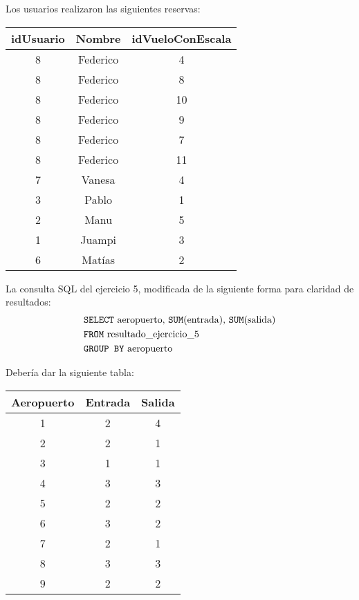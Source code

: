\documentclass{article}
\begin{document}
Los usuarios realizaron las siguientes reservas:
\begin{center}
	\begin{tabular}{ c | c | c }
	\textbf{idUsuario} & \textbf{Nombre} & \textbf{idVueloConEscala} \\ \hline
		8 & Federico & 4 \\
		8 & Federico & 8 \\
		8 & Federico & 10 \\
		8 & Federico & 9 \\
		8 & Federico & 7 \\
		8 & Federico & 11 \\
		7 & Vanesa & 4 \\
		3 & Pablo & 1 \\
		2 & Manu & 5 \\
		1 & Juampi & 3 \\
		6 & Matías & 2 \\
	\end{tabular}
\end{center}

La consulta SQL del ejercicio 5, modificada de la siguiente forma para claridad de resultados:
\begin{align*}
	& \text{\texttt{SELECT} aeropuerto, \texttt{SUM}(entrada), \texttt{SUM}(salida)} \\
	& \text{\texttt{FROM} resultado\_ejercicio\_5} \\
	& \text{\texttt{GROUP BY} aeropuerto} \\
\end{align*}

Debería dar la siguiente tabla:
\begin{center}
	\begin{tabular}{ c | c | c}
		\textbf{Aeropuerto} & \textbf{Entrada} & \textbf{Salida} \\ \hline
		1 & 2 & 4 \\
		2 & 2 & 1 \\
		3 & 1 & 1 \\
		4 & 3 & 3 \\
		5 & 2 & 2 \\
		6 & 3 & 2 \\
		7 & 2 & 1 \\
		8 & 3 & 3 \\
		9 & 2 & 2 \\
	\end{tabular}
\end{center}
\end{document}
